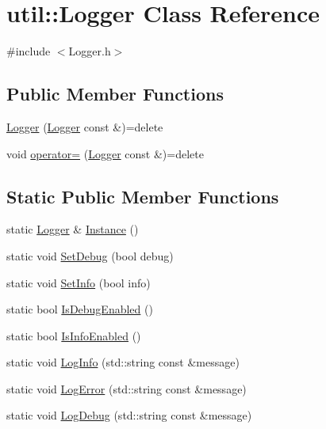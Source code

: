 \hypertarget{classutil_1_1Logger}{}\section{util\+:\+:Logger Class Reference}
\label{classutil_1_1Logger}


{\ttfamily \#include $<$Logger.\+h$>$}

\subsection*{Public Member Functions}
\begin{DoxyCompactItemize}
\item 
\hyperlink{classutil_1_1Logger_a83d4f38e648b39fa61a2b9b3172bda12}{Logger} (\hyperlink{classutil_1_1Logger}{Logger} const \&)=delete
\item 
void \hyperlink{classutil_1_1Logger_a4e9e8b8d0e75058265037976d9b256de}{operator=} (\hyperlink{classutil_1_1Logger}{Logger} const \&)=delete
\end{DoxyCompactItemize}
\subsection*{Static Public Member Functions}
\begin{DoxyCompactItemize}
\item 
static \hyperlink{classutil_1_1Logger}{Logger} \& \hyperlink{classutil_1_1Logger_a734bbf94e1232706f7c0bf52745cc876}{Instance} ()
\item 
static void \hyperlink{classutil_1_1Logger_ac7b9bc580a6d459c212c46b137742869}{Set\+Debug} (bool debug)
\item 
static void \hyperlink{classutil_1_1Logger_a3965358e412007989f90798e295d4b41}{Set\+Info} (bool info)
\item 
static bool \hyperlink{classutil_1_1Logger_a6ee9298451936b98815e20ba7f5d7275}{Is\+Debug\+Enabled} ()
\item 
static bool \hyperlink{classutil_1_1Logger_a194b338af92760d0f7d15b607cad5429}{Is\+Info\+Enabled} ()
\item 
static void \hyperlink{classutil_1_1Logger_a65ac30aaefded61036771197f1364bb8}{Log\+Info} (std\+::string const \&message)
\item 
static void \hyperlink{classutil_1_1Logger_a5a49cf31bcd5a0ccbfe11667b37f338a}{Log\+Error} (std\+::string const \&message)
\item 
static void \hyperlink{classutil_1_1Logger_a89b67d19ea6650ed313dffc0a599385a}{Log\+Debug} (std\+::string const \&message)
\end{DoxyCompactItemize}



